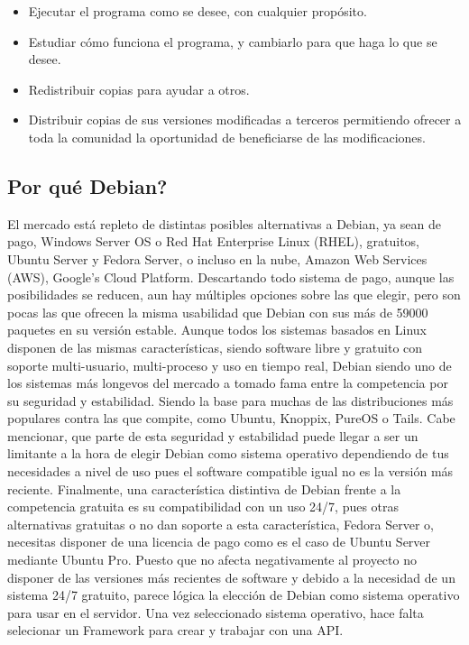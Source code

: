 \begin{itemize}
	\item Ejecutar el programa como se desee, con cualquier propósito.
	\item Estudiar cómo funciona el programa, y cambiarlo para que haga lo que se desee.
	\item Redistribuir copias para ayudar a otros.
	\item Distribuir copias de sus versiones modificadas a terceros permitiendo ofrecer a toda la comunidad la oportunidad de beneficiarse de las modificaciones.
\end{itemize}

\subsection{Por qué Debian?}
El mercado está repleto de distintas posibles alternativas a Debian, ya sean de pago, Windows Server OS o Red Hat Enterprise Linux (RHEL), gratuitos, Ubuntu Server y Fedora Server, o incluso en la nube, Amazon Web Services (AWS), Google’s Cloud Platform.
\newline
\newline
Descartando todo sistema de pago, aunque las posibilidades se reducen, aun hay múltiples opciones sobre las que elegir, pero son pocas las que ofrecen la misma usabilidad que Debian con sus más de 59000 paquetes en su versión estable. \cite{DebWhy}
\newline
\newline
Aunque todos los sistemas basados en Linux disponen de las mismas características, siendo software libre y gratuito con soporte multi-usuario, multi-proceso y uso en tiempo real, Debian siendo uno de los sistemas más longevos del mercado a tomado fama entre la competencia por su seguridad y estabilidad. Siendo la base para muchas de las distribuciones más populares contra las que compite, como Ubuntu, Knoppix, PureOS o Tails.
\newline
\newline
Cabe mencionar, que parte de esta seguridad y estabilidad puede llegar a ser un limitante a la hora de elegir Debian como sistema operativo dependiendo de tus necesidades a nivel de uso pues el software compatible igual no es la versión más reciente.
\newline
\newline
Finalmente, una característica distintiva de Debian frente a la competencia gratuita es su compatibilidad con un uso 24/7, pues otras alternativas gratuitas o no dan soporte a esta característica, Fedora Server o, necesitas disponer de una licencia de pago como es el caso de Ubuntu Server mediante Ubuntu Pro.
\newline
\newline
Puesto que no afecta negativamente al proyecto no disponer de las versiones más recientes de software y debido a la necesidad de un sistema 24/7 gratuito, parece lógica la elección de Debian como sistema operativo para usar en el servidor.\newline
\newline
Una vez seleccionado sistema operativo, hace falta selecionar un Framework para crear y trabajar con una API.

